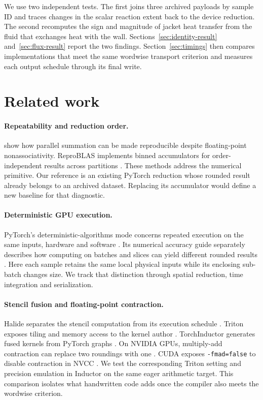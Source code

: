 \documentclass{article}
\newcommand{\code}[1]{\texttt{#1}}
\begin{document}
We use two independent tests. The first joins three archived payloads by sample ID and traces changes in the scalar reaction extent back to the device reduction. The second recomputes the sign and magnitude of jacket heat transfer from the fluid that exchanges heat with the wall. Sections~\ref{sec:identity-result} and~\ref{sec:flux-result} report the two findings. Section~\ref{sec:timings} then compares implementations that meet the same wordwise transport criterion and measures each output schedule through its final write.

\section{Related work}
\paragraph{Repeatability and reduction order.}
\citet{demmel} show how parallel summation can be made reproducible despite floating-point nonassociativity. ReproBLAS implements binned accumulators for order-independent results across partitions \citep{reproblas}. These methods address the numerical primitive. Our reference is an existing PyTorch reduction whose rounded result already belongs to an archived dataset. Replacing its accumulator would define a new baseline for that diagnostic.

\paragraph{Deterministic GPU execution.}
PyTorch's deterministic-algorithms mode concerns repeated execution on the same inputs, hardware and software \citep{torchdet}. Its numerical accuracy guide separately describes how computing on batches and slices can yield different rounded results \citep{batch}. Here each sample retains the same local physical inputs while its enclosing sub-batch changes size. We track that distinction through spatial reduction, time integration and serialization.

\paragraph{Stencil fusion and floating-point contraction.}
Halide separates the stencil computation from its execution schedule \citep{halide}. Triton exposes tiling and memory access to the kernel author \citep{triton}. TorchInductor generates fused kernels from PyTorch graphs \citep{pytorch}. On NVIDIA GPUs, multiply-add contraction can replace two roundings with one \citep{nvidia}. CUDA exposes \code{-fmad=false} to disable contraction in NVCC \citep{nvcc}. We test the corresponding Triton setting and precision emulation in Inductor on the same eager arithmetic target. This comparison isolates what handwritten code adds once the compiler also meets the wordwise criterion.
\end{document}
